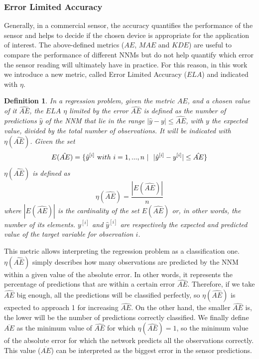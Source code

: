 \documentclass[sensors,article,submit,moreauthors,pdftex,10pt,a4paper]{Definitions/mdpi}
\newtheorem*{definition*}{Definition}
\begin{document}
\subsubsection{Error Limited Accuracy}
\label{sektion:ela}

Generally, in a commercial sensor, the accuracy quantifies the performance of the sensor and helps to decide if the chosen device is appropriate for the application of interest. The above-defined metrics ($AE$, $MAE$ and $KDE$) are useful to compare the performance of different NNMs but do not help quantify which error the sensor reading will ultimately have in practice.
For this reason, in this work we introduce a new metric, called Error Limited Accuracy ($ELA$) and indicated with $\eta$.

\begin{definition*}
In a regression problem, given the metric $AE$, and a chosen value of it $\hat{AE}$, the $ELA$  $\eta$ limited by the error $\hat{AE}$ is defined as the number of predictions $\hat y$ of the NNM that lie in the range $|\hat y-y|\leq \hat{AE}$, with $y$ the expected value, divided by the total number of observations. It will be indicated with $\eta(\hat{AE})$. Given the set
\begin{equation}
E(\hat{AE}) = \{ \hat y^{[i]} \ {\text with } \ i = 1,..., n\ | \ \ |\hat y^{[i]}-y^{[i]}|\leq \hat{AE} \} 
\end{equation}
$\eta(\hat{AE})$ is defined as
\begin{equation}
\eta(\hat{AE}) = \frac{|E(\hat{AE})|}{n}
\end{equation}
where $|E(\hat{AE})|$ is the cardinality of the set $E(\hat{AE})$ or, in other words, the number of its elements. $ y^{[i]}$ and $\hat y^{[i]}$ are respectively the expected and predicted value of the target variable for observation $i$.
\end{definition*}

This metric allows interpreting the regression problem as a classification one. $\eta(\hat{AE})$ simply describes how many observations are predicted by the NNM within a given value of the absolute error. In other words, it represents the percentage of predictions that are within a certain error $\hat{AE}$. Therefore, if we take $\hat{AE}$ big enough, all the predictions will be classified perfectly, so $\eta(\hat{AE})$ is expected to approach 1 for increasing $\hat{AE}$. On the other hand, the smaller $\hat{AE}$ is, the lower will be the number of predictions correctly classified. We finally define $\overline{AE}$ as the minimum value of $\hat{AE}$ for which $\eta(\hat{AE})=1$, so the minimum value of the absolute error for which the network predicts all the observations correctly. This value ($\overline{AE}$) can be interpreted as the biggest error in the sensor predictions.
\end{document}

